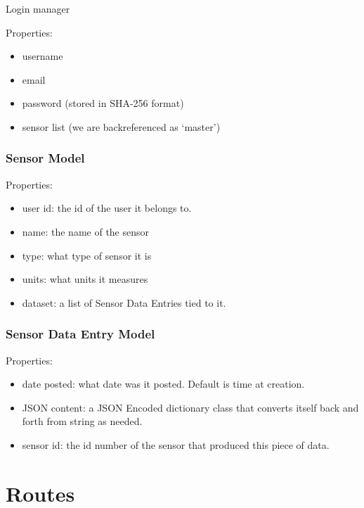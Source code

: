Login manager

Properties:

\begin{itemize}
\itemsep1pt\parskip0pt
\item
  username
\item
  email
\item
  password (stored in SHA-256 format)
\item
  sensor list (we are backreferenced as `master')
\end{itemize}

\subsubsection{Sensor Model}\label{sensor-model}

Properties:

\begin{itemize}
\itemsep1pt\parskip0pt
\item
  user id: the id of the user it belongs to.
\item
  name: the name of the sensor
\item
  type: what type of sensor it is
\item
  units: what units it measures
\item
  dataset: a list of Sensor Data Entries tied to it.
\end{itemize}

\subsubsection{Sensor Data Entry Model}\label{sensor-data-entry-model}

Properties:

\begin{itemize}
\itemsep1pt\parskip0pt
\item
  date posted: what date was it posted. Default is time at creation.
\item
  JSON content: a JSON Encoded dictionary class that converts itself
  back and forth from string as needed.
\item
  sensor id: the id number of the sensor that produced this piece of
  data.
\end{itemize}

\section{Routes}\label{routes}

